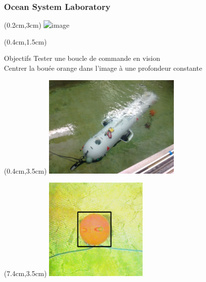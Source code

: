\documentclass[10pt]{beamer}
\begin{document}
\begin{frame}
\frametitle{Ocean System Laboratory}
\begin{textblock*}{9cm}(0.2cm,3cm) %
	\centering
	\includegraphics<1-2>[height = 5cm, keepaspectratio]{Pictures/OSL_nessie_cam.png}
\end{textblock*}
\end{frame}

\begin{frame}
\begin{textblock*}{12cm}(0.4cm,1.5cm) %
\begin{block}{Objectifs}
Tester une boucle de commande en vision \\
Centrer la bouée orange dans l'image à une profondeur constante
\end{block}
\end{textblock*}
\begin{textblock*}{6.1cm}(0.4cm,3.5cm) %
\includegraphics[height=5cm, keepaspectratio]{Pictures/OSL_manip.jpg}
\end{textblock*}
\begin{textblock*}{6.1cm}(7.4cm,3.5cm) %
\includegraphics[height=5cm, keepaspectratio]{Pictures/orange_ball.png}
\end{textblock*}
\end{frame}
\end{document}
